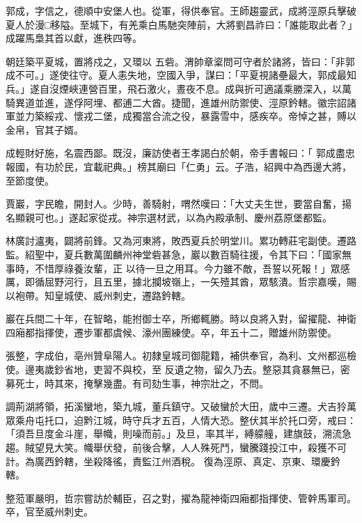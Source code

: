 \begin{pinyinscope}
 郭成，字信之，德順中安堡人也。從軍，得供奉官。王師趨靈武，成將涇原兵擊破夏人於漫□移隘。至城下，有羌乘白馬馳突陣前，大將劉昌祚曰：「誰能取此者？」成躍馬梟其首以獻，進秩四等。



 朝廷築平夏城，置將戍之，又環以
 五砦。渭帥章楶問可守者於諸將，皆曰：「非郭成不可。」遂使往守。夏人恚失地，空國入爭，謀曰：「平夏視諸壘最大，郭成最知兵。」遂自沒煙峽連營百里，飛石激火，晝夜不息。成與折可適議乘勝深入，以萬騎異道並進，遂俘阿埋、都逋二大酋。捷聞，進雄州防禦使、涇原鈐轄。徽宗詔諸軍並力築綏戎、懷戎二堡，成獨當合流之役，暴露雪中，感疾卒。帝悼之甚，賻以金帛，官其子婿。



 成輕財好施，名震西鄙。既沒，廉訪使者王孝謁白於朝，帝手書報曰：「
 郭成盡忠報國，有功於民，宜載祀典。」榜其廟曰「仁勇」云。子浩，紹興中為西邊大將，至節度使。



 賈巖，字民瞻，開封人。少時，善騎射，喟然嘆曰：「大丈夫生世，要當自奮，揚名顯親可也。」遂起家從戎。神宗選材武，以為內殿承制、慶州荔原堡都監。



 林廣討瀘夷，闢將前鋒。又為河東將，敗西夏兵於明堂川。累功轉莊宅副使。遷路監。紹聖中，夏兵數萬圍麟州神堂砦甚急，巖以數百騎往援，令其下曰：「國家無事時，不惜厚祿養汝輩，正
 以待一旦之用耳。今力雖不敵，吾誓以死報！」眾感厲，即循屈野河行，且五里，據北攔坡嶺上，一矢殪其酋，眾駭潰。哲宗嘉嘆，賜以袍帶。知皇城使、威州刺史，遷路鈐轄。



 巖在兵間二十年，在智略，能拊御士卒，所鄉輒勝。時以良將入對，留擢龍、神衛四廂都指揮使，遷步軍都虞候、濠州團練使。卒，年五十二，贈雄州防禦使。



 張整，字成伯，亳州贊阜陽人。初隸皇城司御龍籍，補供奉官，為利、文州都巡檢使。邊夷歲鈔省地，吏習不與校，至
 反遺之物，留久乃去。整惡其貪暴無已，密募死士，時其來，掩擊幾盡。有司劾生事，神宗壯之，不問。



 調荊湖將領，拓溪蠻地，築九城，董兵鎮守。又破蠻於大田，歲中三遷。犬吉狑萬眾乘舟屯托口，迫黔江城，時守兵才五百，人情大恐。整伏其半於托口旁，戒曰：「須吾旦度金斗崖，舉幟，則噪而前。」及旦，率其半，縛艨艟，建旗鼓，溯流急趨。賊望見大笑。幟舉伏發，前後合擊，人人殊死鬥，蠻騰踐投江中，殺獲不可計。為廣西鈐轄，坐殺降徭，責監江州酒稅。
 復為涇原、真定、京東、環慶鈐轄。



 整蒞軍嚴明，哲宗嘗訪於輔臣，召之對，擢為龍神衛四廂都指揮使、管幹馬軍司。卒，官至威州刺史。




\end{pinyinscope}
